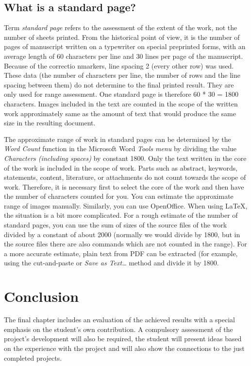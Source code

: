 \documentclass[english,odsaz]{fitthesis}
\begin{document}
\section{What is a standard page?}
\label{sec-4-1}
Term \emph{standard page} refers to the assessment of the extent of the work, not
the number of sheets printed. From the historical point of view, it is the
number of pages of manuscript written on a typewriter on special preprinted
forms, with an average length of 60 characters per line and 30 lines per page of
the manuscript. Because of the correctio nmarkers, line spacing 2 (every other
row) was used. These data (the number of characters per line, the number of rows
and the line spacing between them) do not determine to the final printed
result. They are only used for range assessment. One standard page is therefore
60 * 30 = 1800 characters. Images included in the text are counted in the scope
of the written work approximately same as the amount of text that would produce
the same size in the resulting document.

The approximate range of work in standard pages can be determined by the \emph{Word
Count} function in the Microsoft Word \emph{Tools menu} by dividing the value
\emph{Characters (including spaces)} by constant 1800. Only the text written in the
core of the work is included in the scope of work. Parts such as abstract,
keywords, statements, content, literature, or attachments do not count towards
the scope of work. Therefore, it is necessary first to select the core of the
work and then have the number of characters counted for you. You can estimate
the approximate range of images manually. Similarly, you can use
OpenOffice. When using \LaTeX{}, the situation is a bit more complicated. For a
rough estimate of the number of standard pages, you can use the sum of sizes of
the source files of the work divided by a constant of about 2000 (normally we
would divide by 1800, but in the source files there are also commands which are
not counted in the range). For a more accurate estimate, plain text from PDF can
be extracted (for example, using the cut-and-paste or \emph{Save as Text\ldots{}} method
and divide it by 1800.

\chapter{Conclusion}
\label{sec-5}
The final chapter includes an evaluation of the achieved results with a special
emphasis on the student's own contribution. A compulsory assessment of the
project's development will also be required, the student will present ideas
based on the experience with the project and will also show the connections to
the just completed projects.
\makeatletter
\def\@openbib@code{\addcontentsline{toc}{chapter}{Bibliography}}
\makeatother

\end{document}
